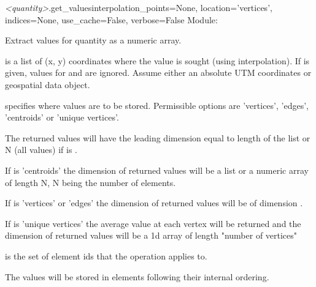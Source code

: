 \documentclass{manual}
\begin{document}
\begin{methoddesc}{\emph{<quantity>}.get_values}{interpolation_points=None,
                   location='vertices',
                   indices=None,
                   use_cache=False,
                   verbose=False}
\label{pg:get values}
Module: 

Extract values for quantity as a numeric array.

 is a list of (x, y) coordinates where the value is
sought (using interpolation). If  is given, values
for  and  are ignored.
Assume either an absolute UTM coordinates or geospatial data object.
    
 specifies where values are to be stored.
Permissible options are 'vertices', 'edges', 'centroids' or 'unique vertices'.

The returned values will have the leading dimension equal to length of the  list or
N (all values) if  is .

If  is 'centroids' the dimension of returned
values will be a list or a numeric array of length N, N being
the number of elements.
      
If  is 'vertices' or 'edges' the dimension of
returned values will be of dimension .

If  is 'unique vertices' the average value at
each vertex will be returned and the dimension of returned values
will be a 1d array of length "number of vertices" 
      
 is the set of element ids that the operation applies to.

The values will be stored in elements following their internal ordering.
\end{methoddesc}
\end{document}
